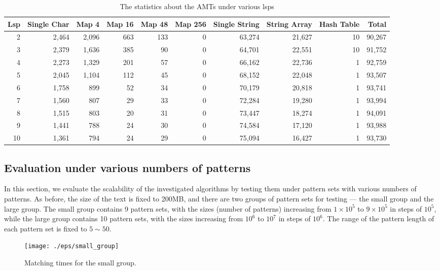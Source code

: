 \documentclass{article}
\begin{document}
\begin{table}[!htp]
  \centering
  \caption{The statistics about the AMTs under various lsps}
  \scriptsize
  \label{tab:node types}
  \begin{tabular}{rrrrrrrrrr}
 \hline
 Lsp &
 Single Char &
 Map 4 &
 Map 16 &
 Map 48 &
 Map 256 &
 Single String &
 String Array   &
 Hash Table &
 Total\\
 \hline
 2  & 2,464 & 2,096 & 663 & 133 & 0 & 63,274 &  21,627 & 10 & 90,267\\
 3  & 2,379 & 1,636 & 385 & 90  & 0 & 64,701 &  22,551 & 10 & 91,752\\
 4  & 2,273 & 1,329 & 201 & 57  & 0 & 66,162 &  22,736 &  1 & 92,759\\
 5  & 2,045 & 1,104 & 112 & 45  & 0 & 68,152 &  22,048 &  1 & 93,507\\
 6  & 1,758 &   899 &  52 & 34  & 0 & 70,179 &  20,818 &  1 & 93,741\\
 7  & 1,560 &   807 &  29 & 33  & 0 & 72,284 &  19,280 &  1 & 93,994\\
 8  & 1,515 &   803 &  20 & 31  & 0 & 73,447 &  18,274 &  1 & 94,091\\
 9  & 1,441 &   788 &  24 & 30  & 0 & 74,584 &  17,120 &  1 & 93,988\\
10  & 1,361 &   794 &  24 & 29  & 0 & 75,094 &  16,427 &  1 & 93,730\\
\hline
  \end{tabular}
\end{table}

\subsection{Evaluation under various numbers of patterns}

In this section, we evaluate the scalability of the investigated
algorithms by testing them under pattern sets with various numbers of
patterns. As before, the size of the text is fixed to 200MB, and there
are two groups of pattern sets for testing --- the small group and the
large group. The small group contains 9 pattern sets, with the sizes
(number of patterns) increasing from $1 \times 10^5$ to
$9 \times 10^5$ in steps of $10^5$, while the large group contains 10
pattern sets, with the sizes increasing from $10^6$ to $10^7$ in steps
of $10^6$. The range of the pattern length of each pattern set is
fixed to $5 \sim 50$.

\begin{figure}[htbp]
  \centering
  \texttt{[image: ./eps/small\_group]}
  \caption{Matching times for the small group.}
  \label{fig:small_group}
\end{figure}
\end{document}
